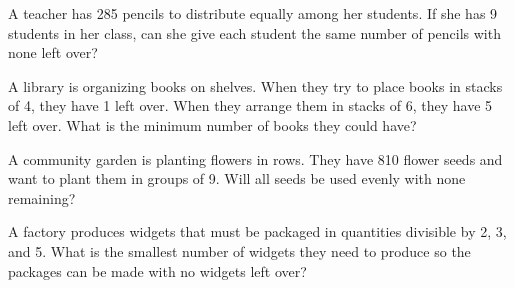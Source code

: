 \documentclass{article}
\theoremstyle{mytheoremstyle}
\theoremstyle{mytheoremstyle}
\theoremstyle{myproblemstyle}
\theoremstyle{myproblemstyle}
\begin{document}
        \begin{problem}
            A teacher has 285 pencils to distribute equally among her students. If she has 9 students in her class, can she give each student the same number of pencils with none left over?
        \end{problem}

        \begin{problem}
            A library is organizing books on shelves. When they try to place books in stacks of 4, they have 1 left over. When they arrange them in stacks of 6, they have 5 left over. What is the minimum number of books they could have?
        \end{problem}

        \begin{problem}
            A community garden is planting flowers in rows. They have 810 flower seeds and want to plant them in groups of 9. Will all seeds be used evenly with none remaining?
        \end{problem}

        \begin{problem}
            A factory produces widgets that must be packaged in quantities divisible by 2, 3, and 5. What is the smallest number of widgets they need to produce so the packages can be made with no widgets left over?
        \end{problem}
\end{document}

